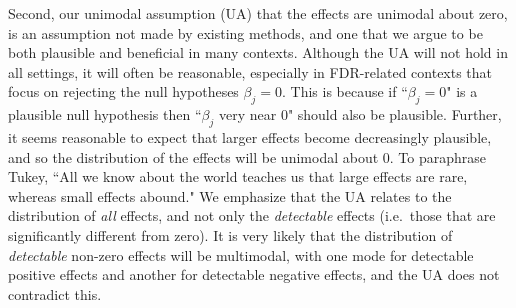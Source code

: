\documentclass[11pt]{article}
\def\qvalue{{\tt qvalue}\xspace}
\def\locfdr{{\tt locfdr}\xspace}
\def\mixfdr{{\tt mixfdr}\xspace}
\begin{document}
Second, our unimodal assumption (UA) that the effects are unimodal about zero, is an assumption 
not made by existing methods, and one that we argue to be both plausible and beneficial in many contexts.
Although the UA will not hold in all settings, it will often be reasonable, especially in FDR-related contexts
that focus on rejecting the null hypotheses $\beta_j=0$. This is because if ``$\beta_j=0$" is a plausible null hypothesis
then ``$\beta_j$ very near 0" should also be plausible. Further, it seems reasonable to expect that larger effects become
decreasingly plausible, and so the distribution of the effects will be unimodal about 0. 
To paraphrase Tukey, ``All we know about the world teaches us that large effects are rare, whereas small effects abound."
We emphasize that the UA relates to the distribution of {\it all} effects, and not only the {\it detectable} effects (i.e.~those that are significantly different from zero). It is very likely that the distribution of {\it detectable} non-zero effects will be multimodal, with one mode for detectable positive effects and another for detectable negative effects, and the UA does not contradict this.


\end{document}
